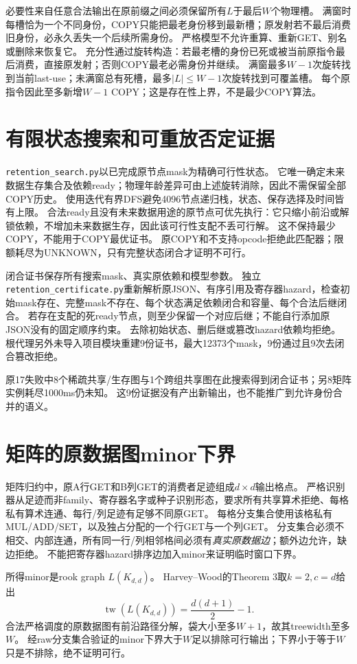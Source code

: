 \documentclass[UTF8,11pt,a4paper]{ctexart}
\begin{document}
必要性来自任意合法输出在原前缀之间必须保留所有$L$于最后$W$个物理槽。
满窗时每槽恰为一个不同身份，COPY只能把最老身份移到最新槽；原发射若不最后消费旧身份，必永久丢失一个后续所需身份。
严格模型不允许重算、重新GET、别名或删除来恢复它。
充分性通过旋转构造：若最老槽的身份已死或被当前原指令最后消费，直接原发射；否则COPY最老必需身份并继续。
满窗最多$W-1$次旋转找到当前last-use；未满窗总有死槽，最多$|L|\leq W-1$次旋转找到可覆盖槽。
每个原指令因此至多新增$W-1$ COPY；这是存在性上界，不是最少COPY算法。

\section{有限状态搜索和可重放否定证据}
\texttt{retention\_search.py}以已完成原节点mask为精确可行性状态。
它唯一确定未来数据生存集合及依赖ready；物理年龄差异可由上述旋转消除，因此不需保留全部COPY历史。
使用迭代有界DFS避免4096节点递归栈，状态、保存选择及时间皆有上限。
合法ready且没有未来数据用途的原节点可优先执行：它只缩小前沿或解锁依赖，不增加未来数据生存，因此该可行性支配不丢可行解。
这不保持最少COPY，不能用于COPY最优证书。
原COPY和不支持opcode拒绝此匹配器；限额耗尽为UNKNOWN，只有完整状态闭合才证明不可行。

闭合证书保存所有搜索mask、真实原依赖和模型参数。
独立\texttt{retention\_certificate.py}重新解析原JSON、有序引用及寄存器hazard，检查初始mask存在、完整mask不存在、每个状态满足依赖闭合和容量、每个合法后继闭合。
若存在支配的死ready节点，则至少保留一个对应后继；不能自行添加原JSON没有的固定顺序约束。
去除初始状态、删后继或篡改hazard依赖均拒绝。
根代理另外未导入项目模块重建9份证书，最大12373个mask，9份通过且9次去闭合篡改拒绝。

原17失败中8个稀疏共享/生存图与1个跨组共享图在此搜索得到闭合证书；另8矩阵实例耗尽1000ms仍未知。
这9份证据没有产出新输出，也不能推广到允许身份合并的语义。

\section{矩阵的原数据图minor下界}
矩阵归约中，原A行GET和B列GET的消费者足迹组成$d\times d$输出格点。
严格识别器从足迹而非family、寄存器名字或种子识别形态，要求所有共享算术拒绝、每格私有算术连通、每行/列足迹有足够不同原GET。
每格分支集合使用该格私有MUL/ADD/SET，以及独占分配的一个行GET与一个列GET。
分支集合必须不相交、内部连通，所有同一行/列相邻格间必须有\emph{真实原数据边}；额外边允许，缺边拒绝。
不能把寄存器hazard排序边加入minor来证明临时窗口下界。

所得minor是rook graph $L(K_{d,d})$。
Harvey--Wood的Theorem 3取$k=2,c=d$给出\cite{harvey}
\[
\operatorname{tw}(L(K_{d,d}))=\frac{d(d+1)}2-1.
\]
合法严格调度的原数据图有前沿路径分解，袋大小至多$W+1$，故其treewidth至多$W$。
经raw分支集合验证的minor下界大于$W$足以排除可行输出；下界小于等于$W$只是不排除，绝不证明可行。
\end{document}
